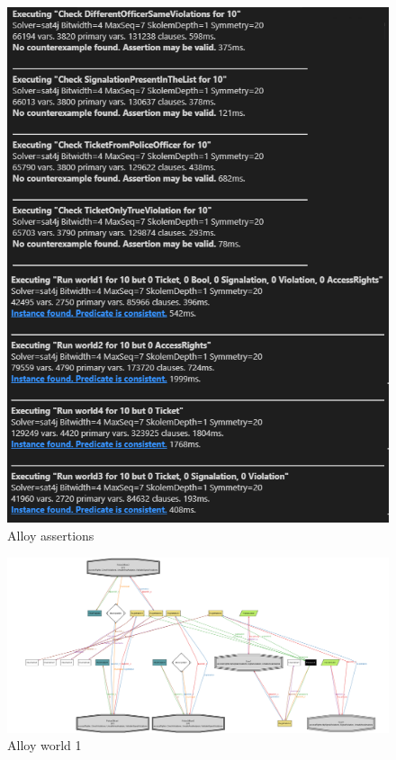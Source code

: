\documentclass{article}
\begin{document}
\begin{figure}[H]
    \centering
    \includegraphics[scale=1]{Images/Alloy-Assertions}
    \caption{Alloy assertions}
\end{figure}
\begin{figure}[H]
    \centering
    \includegraphics[angle=90,scale=0.25]{Images/Alloy-World1}
    \caption{Alloy world 1}
\end{figure}
\end{document}
